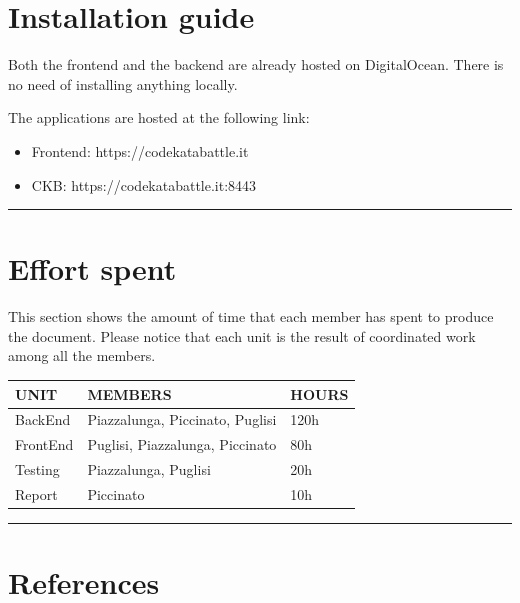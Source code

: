 \documentclass{Configuration_Files/Template}
\begin{document}
\chapter{Installation guide}

Both the frontend and the backend are already hosted on DigitalOcean.
There is no need of installing anything locally.

The applications are hosted at the following link:

\begin{itemize}
\item \textcolor{bluepoli}{Frontend:} https://codekatabattle.it
\item \textcolor{bluepoli}{CKB:} https://codekatabattle.it:8443
\end{itemize}

{\color{bluepoli}\rule{\linewidth}{0.1pt}}

\chapter{Effort spent}

This section shows the amount of time that each member has spent to produce the document. Please notice that each unit is the result of coordinated work among all the members.

\begin{table}[h]
\centering
\begin{tabularx}{\textwidth}{| X | X | X |}
\hline
\textbf{UNIT} & \textbf{MEMBERS} & \textbf{HOURS} \\ [1ex]
\hline
BackEnd & Piazzalunga, Piccinato, Puglisi & 120h \\ [1ex]
\hline
FrontEnd & Puglisi, Piazzalunga, Piccinato & 80h \\ [1ex]
\hline
Testing & Piazzalunga, Puglisi& 20h \\ [1ex]
\hline
Report & Piccinato & 10h \\ [1ex]
\hline
\end{tabularx}
\end{table}

{\color{bluepoli}\rule{\linewidth}{0.1pt}}

\chapter{References}
\end{document}
